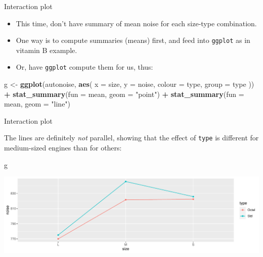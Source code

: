 \documentclass[
  ignorenonframetext,
]{beamer}
\newenvironment{Shaded}{\begin{snugshade}}{\end{snugshade}}
\newcommand{\DataTypeTok}[1]{\textcolor[rgb]{0.13,0.29,0.53}{#1}}
\newcommand{\KeywordTok}[1]{\textcolor[rgb]{0.13,0.29,0.53}{\textbf{#1}}}
\newcommand{\NormalTok}[1]{#1}
\newcommand{\OperatorTok}[1]{\textcolor[rgb]{0.81,0.36,0.00}{\textbf{#1}}}
\newcommand{\StringTok}[1]{\textcolor[rgb]{0.31,0.60,0.02}{#1}}
\begin{document}
\begin{frame}[fragile]{Interaction plot}
\protect\hypertarget{interaction-plot-1}{}

\begin{itemize}
\item
  This time, don't have summary of mean noise for each size-type
  combination.
\item
  One way is to compute summaries (means) first, and feed into
  \texttt{ggplot} as in vitamin B example.
\item
  Or, have \texttt{ggplot} compute them for us, thus:
\end{itemize}

\begin{Shaded}
\begin{Highlighting}[]
\NormalTok{g <-}\StringTok{ }\KeywordTok{ggplot}\NormalTok{(autonoise, }\KeywordTok{aes}\NormalTok{(}
  \DataTypeTok{x =}\NormalTok{ size, }\DataTypeTok{y =}\NormalTok{ noise,}
  \DataTypeTok{colour =}\NormalTok{ type, }\DataTypeTok{group =}\NormalTok{ type}
\NormalTok{)) }\OperatorTok{+}
\StringTok{  }\KeywordTok{stat_summary}\NormalTok{(}\DataTypeTok{fun =}\NormalTok{ mean, }\DataTypeTok{geom =} \StringTok{"point"}\NormalTok{) }\OperatorTok{+}
\StringTok{  }\KeywordTok{stat_summary}\NormalTok{(}\DataTypeTok{fun =}\NormalTok{ mean, }\DataTypeTok{geom =} \StringTok{"line"}\NormalTok{)}
\end{Highlighting}
\end{Shaded}

\end{frame}

\begin{frame}[fragile]{Interaction plot}
\protect\hypertarget{interaction-plot-2}{}

The lines are definitely \emph{not} parallel, showing that the effect of
\texttt{type} is different for medium-sized engines than for others:

\begin{Shaded}
\begin{Highlighting}[]
\NormalTok{g}
\end{Highlighting}
\end{Shaded}

\includegraphics{slides_d29_files/figure-beamer/unnamed-chunk-216-1.pdf}

\end{frame}
\end{document}
